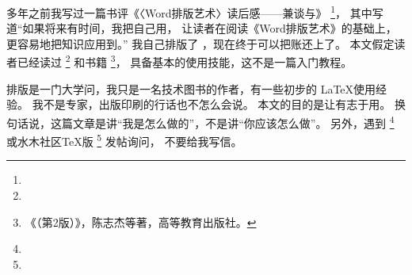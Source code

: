 多年之前我写过一篇书评《〈Word排版艺术〉读后感——兼谈与》
\footnote{}，
其中写道“{\kaishu 如果将来有时间，我把自己用，
让读者在阅读《Word排版艺术》的基础上，更容易地把知识应用到。}”
我自己排版了 \mybooktitle，现在终于可以把账还上了。
本文假定读者已经读过
\footnote{}
和书籍
\footnote{《（第2版）》，陈志杰等著，高等教育出版社。}，
具备基本的使用技能，这不是一篇入门教程。

排版是一门大学问，我只是一名技术图书的作者，有一些初步的 \LaTeX 使用经验。
我不是专家，出版印刷的行话也不怎么会说。
本文的目的是让有志于用。
换句话说，这篇文章是讲“我是怎么做的”，不是讲“你应该怎么做”。
另外，遇到
\footnote{ } 或水木社区TeX版
\footnote{} 发帖询问，
不要给我写信。